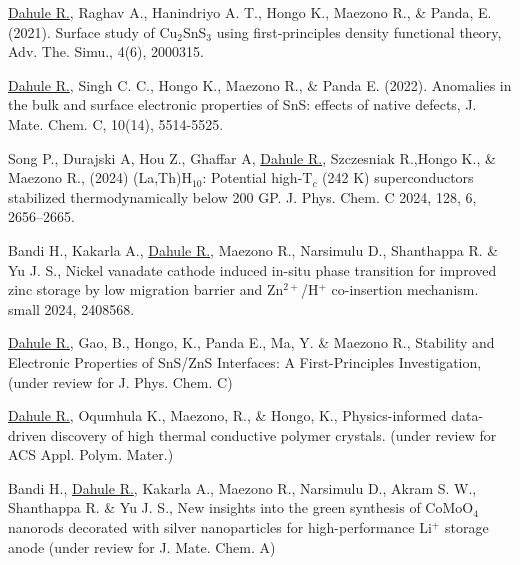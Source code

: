 \begin{enumerate}[label={[\arabic*]}]
    \item \underline{Dahule R.}, Raghav A., Hanindriyo A. T., Hongo K., Maezono R.,
        \& Panda, E. (2021). Surface study of Cu$_2$SnS$_3$ using first‐principles
        density functional theory,  Adv. The. Simu., 4(6), 2000315.
    \item \underline{Dahule R.}, Singh C. C., Hongo K., Maezono R., \& Panda E.
        (2022). Anomalies in the bulk and surface electronic properties of SnS:
        effects of native defects,  J. Mate. Chem. C, 10(14), 5514-5525.
    \item Song P., Durajski A, Hou Z., Ghaffar A, \underline{Dahule R.}, Szczesniak R.,Hongo K.,
        \& Maezono R., (2024) (La,Th)H$_{10}$: Potential high-T$_c$ (242 K) 
        superconductors stabilized thermodynamically below 200 GP. 
        J. Phys. Chem. C 2024, 128, 6, 2656–2665.
    \item Bandi H., Kakarla A., \underline{Dahule R.}, Maezono R., Narsimulu D.,
         Shanthappa R. \& Yu J. S.,
         Nickel vanadate cathode induced in-situ phase transition for improved zinc storage
         by low migration barrier and Zn$^{2+}$/H$^+$ co-insertion mechanism.
         small 2024, 2408568.
    \item \underline{Dahule R.}, Gao, B., Hongo, K., Panda E., Ma, Y. \& Maezono R., 
        Stability and Electronic Properties of SnS/ZnS Interfaces: 
        A First-Principles Investigation, 
        (under review for J. Phys. Chem. C)
    \item \underline{Dahule R.}, Oqumhula K., Maezono, R., \& Hongo, K., 
        Physics-informed data-driven discovery of high thermal conductive polymer crystals. 
        (under review for ACS Appl. Polym. Mater.)
    \item Bandi H., \underline{Dahule R.}, Kakarla A., Maezono R., Narsimulu D., 
        Akram S. W.,  Shanthappa R. \& Yu J. S., 
        New insights into the green synthesis of CoMoO$_{4}$ nanorods decorated with 
        silver nanoparticles for high-performance Li$^+$ storage anode 
        (under review for J. Mate. Chem. A)
\end{enumerate}

